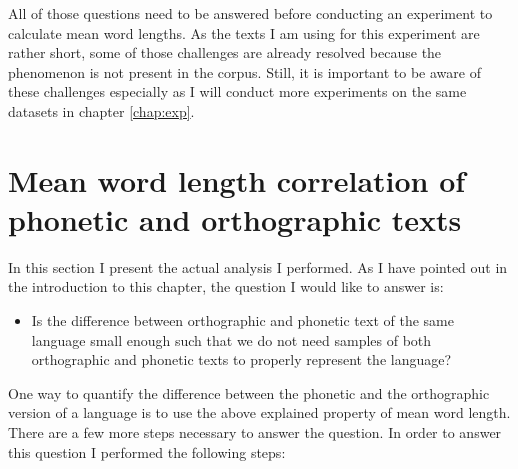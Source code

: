 All of those questions need to be answered before conducting an experiment to calculate mean word lengths. As the texts I am using for this experiment are rather short, some of those challenges are already resolved because the phenomenon is not present in the corpus. Still, it is important to be aware of these challenges especially as I will conduct more experiments on the same datasets in chapter \ref{chap:exp}.

\section{Mean word length correlation of phonetic and orthographic texts}
\label{sec:mean-len-experiment}
In this section I present the actual analysis I performed. As I have pointed out in the introduction to this chapter, the question I would like to answer is:

\begin{itemize}
    \item Is the difference between orthographic and phonetic text of the same language small enough such that we do not need samples of both orthographic and phonetic texts to properly represent the language?
\end{itemize}

One way to quantify the difference between the phonetic and the orthographic version of a language is to use the above explained property of mean word length. There are a few more steps necessary to answer the question. In order to answer this question I performed the following steps:


